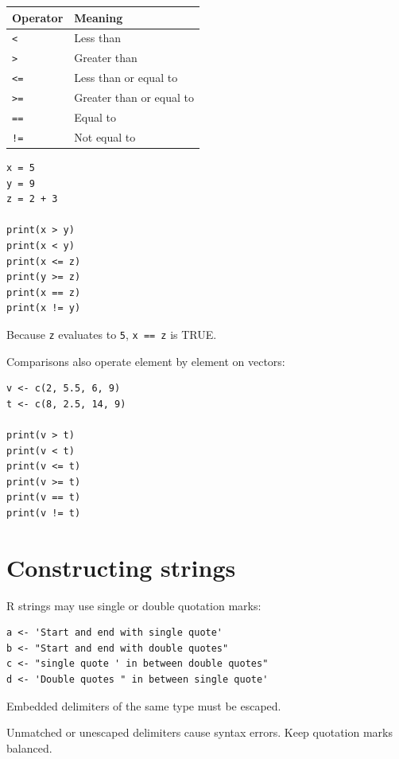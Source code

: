 \begin{dstable}
\begin{tabularx}{\linewidth}{@{}p{2.4cm}X@{}}
\toprule
\rowcolor{DSPaleBlue!92}
Operator & Meaning \\
\midrule
\texttt{<} & Less than \\
\texttt{>} & Greater than \\
\texttt{<=} & Less than or equal to \\
\texttt{>=} & Greater than or equal to \\
\texttt{==} & Equal to \\
\texttt{!=} & Not equal to \\
\bottomrule
\end{tabularx}
\end{dstable}

\begin{lstlisting}[style=dsr]
x = 5
y = 9
z = 2 + 3

print(x > y)
print(x < y)
print(x <= z)
print(y >= z)
print(x == z)
print(x != y)
\end{lstlisting}

Because \texttt{z} evaluates to \texttt{5}, \texttt{x == z} is TRUE.

Comparisons also operate element by element on vectors:

\begin{lstlisting}[style=dsr]
v <- c(2, 5.5, 6, 9)
t <- c(8, 2.5, 14, 9)

print(v > t)
print(v < t)
print(v <= t)
print(v >= t)
print(v == t)
print(v != t)
\end{lstlisting}

\section{Constructing strings}

R strings may use single or double quotation marks:

\begin{lstlisting}[style=dsr]
a <- 'Start and end with single quote'
b <- "Start and end with double quotes"
c <- "single quote ' in between double quotes"
d <- 'Double quotes " in between single quote'
\end{lstlisting}

Embedded delimiters of the same type must be escaped.

\begin{pitfall}
Unmatched or unescaped delimiters cause syntax errors. Keep quotation marks balanced.
\end{pitfall}

